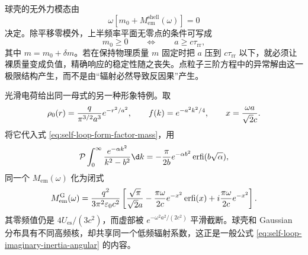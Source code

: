 球壳的无外力模态由
\begin{equation*}
 \omega\left[m_0+M_{\mathrm{em}}^{\mathrm{shell}}(\omega)\right]=0
\end{equation*}
决定。除平移零模外，上半频率平面无零点的条件可写成
\begin{equation}
 m_0\geq0
 \qquad\Longleftrightarrow\qquad
 a\geq c\tau_{\mathrm{rr}},
 \label{eq:self-loop-shell-stability}
\end{equation}
其中 $m=m_0+\delta m$。若在保持物理质量 $m$ 固定时把 $a$ 压到 $c\tau_{\mathrm{rr}}$ 以下，就必须让裸质量变成负值，精确响应的稳定性随之丧失。点粒子三阶方程中的异常解由这一极限结构产生，而不是由“辐射必然导致反因果”产生。

光滑电荷给出同一母式的另一种形象特例。取
\begin{equation*}
 \rho_0(r)={q\over\pi^{3/2}a^3}e^{-r^2/a^2},
 \qquad
 f(k)=e^{-a^2k^2/4},
 \qquad
 x={\omega a\over\sqrt2c}.
\end{equation*}
将它代入式 \eqref{eq:self-loop-form-factor-mass}，用
\begin{equation*}
 \mathcal P\int_0^\infty{e^{-\alpha k^2}\over k^2-b^2}\d k
 =-{\pi\over2b}e^{-\alpha b^2}\operatorname{erfi}(b\sqrt\alpha),
\end{equation*}
同一个 $M_{\mathrm{em}}(\omega)$ 化为闭式
\begin{equation}
 M_{\mathrm{em}}^{\mathrm G}(\omega)
 ={q^2\over3\pi^2\varepsilon_0c^2}
 \left[
 {\sqrt\pi\over\sqrt2a}
 -{\pi\omega\over2c}e^{-x^2}\operatorname{erfi}(x)
 +i{\pi\omega\over2c}e^{-x^2}
 \right].
 \label{eq:self-loop-gaussian-mass}
\end{equation}
其零频值仍是 $4U_{\mathrm{es}}/(3c^2)$，而虚部被 $e^{-\omega^2a^2/(2c^2)}$ 平滑截断。球壳和 Gaussian 分布具有不同高频核，却共享同一个低频辐射系数，这正是一般公式 \eqref{eq:self-loop-imaginary-inertia-angular} 的内容。

